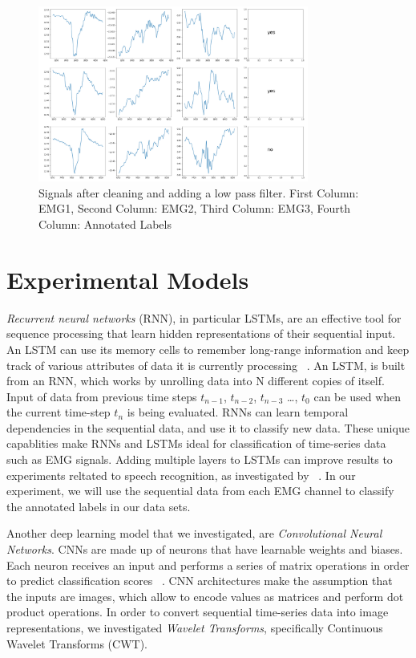 \documentclass[conference]{IEEEtran}
\begin{document}
\begin{figure}[!t]
\centering
\includegraphics[width=3.5in]{images/cleaned_signals.png}
\caption{Signals after cleaning and adding a low pass filter. First Column: EMG1, Second Column: EMG2, Third Column: EMG3,
Fourth Column: Annotated Labels}
\label{fig: cleaned_signals}
\end{figure}

\section{Experimental Models}
\textit{Recurrent neural networks} (RNN), in particular LSTMs, are an effective tool for sequence processing that learn hidden representations of their sequential input. An LSTM can use its memory cells to remember long-range information and keep track of various attributes of data it is currently processing ~\cite{karpathy_visualizing_2016}. An LSTM, is built from an RNN, which works by unrolling data into N different copies of itself. Input of data from previous time steps $t_{n-1}$, $t_{n-2}$, $t_{n-3}$ \ldots, $t_{0}$ can be used when the current time-step $t_{n}$ is being evaluated. RNNs can learn temporal dependencies in the sequential data, and use it to classify new data. These unique capablities make RNNs and LSTMs ideal for classification of time-series data such as EMG signals. Adding multiple layers to LSTMs can improve results to experiments reltated to speech recognition, as investigated by ~\cite{graves_speech_2013}. In our experiment, we will use the sequential data from each EMG channel to classify the annotated labels in our data sets.

Another deep learning model that we investigated, are \textit{Convolutional Neural Networks}. CNNs are made up of neurons that have learnable weights and biases. Each neuron receives an input and performs a series of matrix operations in order to predict classification scores ~\cite{noauthor_cs231n_nodate}. CNN architectures make the assumption that the inputs are images, which allow to encode values as matrices and perform dot product operations. In order to convert sequential time-series data into image representations, we investigated \textit{Wavelet Transforms}, specifically Continuous Wavelet Transforms (CWT).
\end{document}
